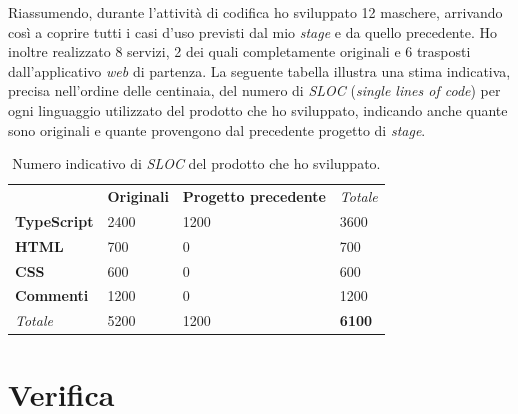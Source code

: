 Riassumendo, durante l'attività di codifica ho sviluppato 12 maschere, arrivando così a coprire tutti i casi d'uso previsti dal mio \textit{stage} e da quello precedente. Ho inoltre realizzato 8 servizi, 2 dei quali completamente originali e 6 trasposti dall'applicativo \textit{web} di partenza. La seguente tabella illustra una stima indicativa, precisa nell'ordine delle centinaia, del numero di \textit{SLOC} (\textit{single lines of code}) per ogni linguaggio utilizzato del prodotto che ho sviluppato, indicando anche quante sono originali e quante provengono dal precedente progetto di \textit{stage}.

\begin{table}[h]
  \label{tab:sloc}
  \begin{center}
  \begin{tabularx}{\textwidth}{llll}
    & \textbf{Originali}        & \textbf{Progetto precedente} & \textit{Totale}                    \\ \cline{2-4}
\multicolumn{1}{l|}{\textbf{TypeScript}} & \multicolumn{1}{l|}{2400} & \multicolumn{1}{l|}{1200}     & \multicolumn{1}{l|}{3600}          \\ \cline{2-4}
\multicolumn{1}{l|}{\textbf{HTML}}       & \multicolumn{1}{l|}{700}  & \multicolumn{1}{l|}{0}       & \multicolumn{1}{l|}{700}           \\ \cline{2-4}
\multicolumn{1}{l|}{\textbf{CSS}}        & \multicolumn{1}{l|}{600}  & \multicolumn{1}{l|}{0}       & \multicolumn{1}{l|}{600}           \\ \cline{2-4}
\multicolumn{1}{l|}{\textbf{Commenti}}   & \multicolumn{1}{l|}{1200} & \multicolumn{1}{l|}{0}       & \multicolumn{1}{l|}{1200}          \\ \cline{2-4}
\multicolumn{1}{l|}{\textit{Totale}}     & \multicolumn{1}{l|}{5200} & \multicolumn{1}{l|}{1200}     & \multicolumn{1}{l|}{\textbf{6100}} \\ \cline{2-4}
\end{tabularx}
  \end{center}
\caption{Numero indicativo di \textit{SLOC} del prodotto che ho sviluppato.}
\end{table}



\section{Verifica}

